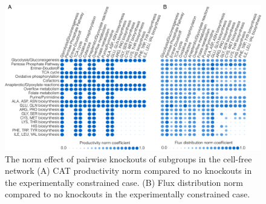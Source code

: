 \documentclass[journal=asbcd6,manuscript=article]{achemso}
\begin{document}
\begin{figure}[t!]
\includegraphics[width=1.0\textwidth]{./figs/Fig-7-FluxDistribution-Analysis.pdf}
\caption{The norm effect of pairwise knockouts of subgroups in the cell-free network (A) CAT productivity norm compared to no knockouts in the experimentally constrained case. (B) Flux distribution norm compared to no knockouts in the experimentally constrained case.}
\label{fig:norm}
\end{figure}

\end{document}
